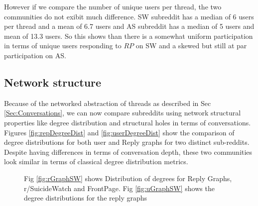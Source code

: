 However if we  compare the number of unique users per thread, the two communities do not exibit much difference. SW subreddit has a median of 6 users per thread and a mean of 6.7 users and AS subreddit has a median of 5 users and mean of 13.3 users. So this shows than there is a somewhat uniform participation in terms of unique users responding to $RP$ on SW and a skewed but still at par participation on AS. 

\subsection{Network structure}
Because of the networked abstraction of threads as described in Sec \ref{Sec:Conversations}, we can now compare subreddits using network structural properties like degree distribution and structural holes in terms of conversations. 
Figures \ref{fig:repDegreeDist} and \ref{fig:userDegreeDist} show the comparison of degree distributions for both user and Reply graphs for two distinct sub-reddits. Despite having differences in terms of conversation depth, these two communities look similar in terms of classical degree distribution metrics. 

\begin{figure}[!ht]
	\centering
\caption{Fig \ref{fig:rGraphSW} shows Distribution of degrees for Reply Graphs,  r/SuicideWatch and FrontPage. Fig \ref{fig:uGraphSW} shows the degree distributions for the reply graphs}
\end{figure}

